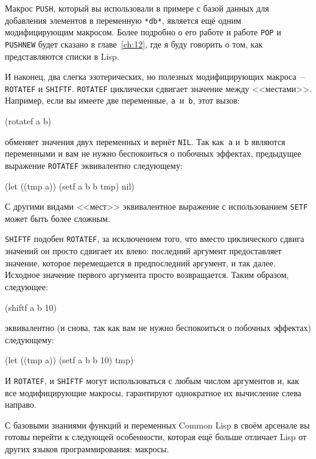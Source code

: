 Макрос \lstinline{PUSH}, который вы использовали в примере с базой данных для добавления
элементов в переменную \lstinline{*db*}, является ещё одним модифицирующим макросом. Более подробно о
его работе и работе \lstinline{POP} и \lstinline{PUSHNEW} будет сказано в главе~\ref{ch:12}, где
я буду говорить о том, как представляются списки в Lisp.

И наконец, два слегка эзотерических, но полезных модифицирующих макроса~--
\lstinline{ROTATEF} и \lstinline{SHIFTF}. \lstinline{ROTATEF} циклически сдвигает значение между
<<местами>>. Например, если вы имеете две переменные, \lstinline{a}~и~\lstinline{b}, этот вызов:

\begin{myverb}
(rotatef a b)
\end{myverb}

\noindent{}обменяет значения двух переменных и вернёт \lstinline{NIL}. Так
как~\lstinline{a} и~\lstinline{b} являются переменными и вам не нужно беспокоиться о
побочных эффектах, предыдущее выражение \lstinline{ROTATEF} эквивалентно следующему:

\begin{myverb}
(let ((tmp a)) (setf a b b tmp) nil)
\end{myverb}

С другими видами <<мест>> эквивалентное выражение с использованием \lstinline{SETF} может быть
более сложным.

\lstinline{SHIFTF} подобен \lstinline{ROTATEF}, за исключением того, что вместо циклического
сдвига значений он просто сдвигает их влево: последний аргумент предоставляет значение,
которое перемещается в предпоследний аргумент, и так далее. Исходное значение первого
аргумента просто возвращается. Таким образом, следующее:

\begin{myverb}
(shiftf a b 10)
\end{myverb}

\noindent{}эквивалентно (и снова, так как вам не нужно беспокоиться о побочных эффектах) следующему:

\begin{myverb}
(let ((tmp a)) (setf a b b 10) tmp)
\end{myverb}

И \lstinline{ROTATEF}, и \lstinline{SHIFTF} могут использоваться с любым числом аргументов и,
как все модифицирующие макросы, гарантируют однократное их вычисление слева направо.

С базовыми знаниями функций и переменных Common Lisp в своём арсенале вы готовы перейти к
следующей особенности, которая ещё больше отличает Lisp от других языков программирования:
макросы.

